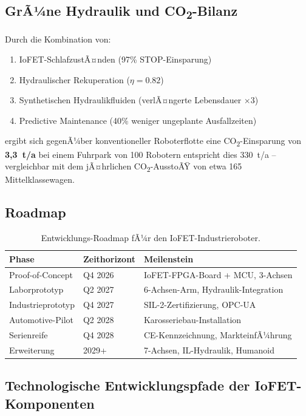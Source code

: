 ﻿\documentclass[a4paper,12pt]{scrreprt}
\theoremstyle{definition}
\begin{document}
\subsection{GrÃ¼ne Hydraulik und CO\textsubscript{2}-Bilanz}

Durch die Kombination von:
\begin{enumerate}
  \item IoFET-SchlafzustÃ¤nden (97\% STOP-Einsparung)
  \item Hydraulischer Rekuperation ($\eta = 0.82$)
  \item Synthetischen Hydraulikfluiden (verlÃ¤ngerte Lebensdauer $\times$3)
  \item Predictive Maintenance (40\% weniger ungeplante Ausfallzeiten)
\end{enumerate}
ergibt sich gegenÃ¼ber konventioneller Roboterflotte eine
CO\textsubscript{2}-Einsparung von \textbf{3{,}3~t/a}
bei einem Fuhrpark von 100 Robotern entspricht dies
330~t/a -- vergleichbar mit dem jÃ¤hrlichen
CO\textsubscript{2}-AusstoÃŸ von etwa 165 Mittelklassewagen.

\subsection{Roadmap}

\begin{table}[H]
\centering
\caption{Entwicklungs-Roadmap fÃ¼r den IoFET-Industrieroboter.}
\label{tab:roadmap}
\small
\begin{tabular}{|l|l|l|}
\hline
\rowcolor{iofetblue!20}
\textbf{Phase} & \textbf{Zeithorizont} & \textbf{Meilenstein} \\
\hline
Proof-of-Concept & Q4 2026 & IoFET-FPGA-Board + MCU, 3-Achsen \\
\hline
Laborprototyp & Q2 2027 & 6-Achsen-Arm, Hydraulik-Integration \\
\hline
Industrieprototyp & Q4 2027 & SIL-2-Zertifizierung, OPC-UA \\
\hline
Automotive-Pilot & Q2 2028 & Karosseriebau-Installation \\
\hline
Serienreife & Q4 2028 & CE-Kennzeichnung, MarkteinfÃ¼hrung \\
\hline
Erweiterung & 2029+ & 7-Achsen, IL-Hydraulik, Humanoid \\
\hline
\end{tabular}
\end{table}

\subsection{Technologische Entwicklungspfade der IoFET-Komponenten}
\end{document}
